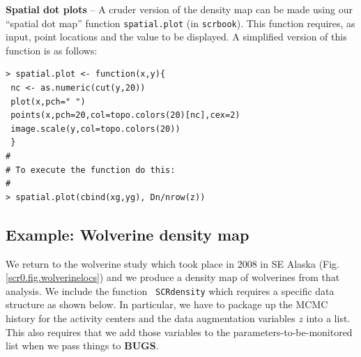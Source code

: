 {\bf Spatial dot plots } -- A cruder version of the density map can be
made using our
``spatial dot map'' function \mbox{\tt spatial.plot} (in
\mbox{\tt scrbook}).
This function requires, as input, point
locations and the value to be displayed. A simplified
version of this function is as follows:
\begin{verbatim}
> spatial.plot <- function(x,y){
 nc <- as.numeric(cut(y,20))
 plot(x,pch=" ")
 points(x,pch=20,col=topo.colors(20)[nc],cex=2)
 image.scale(y,col=topo.colors(20))
 }
#
# To execute the function do this:
#
> spatial.plot(cbind(xg,yg), Dn/nrow(z))
\end{verbatim}

\subsection{Example: Wolverine density map}

We return to the wolverine study which took place in 2008 in SE Alaska
(Fig. \ref{scr0.fig.wolverinelocs}) and we produce a density map of
wolverines from that analysis. We include the function \mbox{\tt
  SCRdensity} which requires a specific data structure as shown
below. In particular, we have to package up the MCMC history for the
activity centers and the data augmentation variables $z$ into a
list. This also requires that we add those variables to the
parameters-to-be-monitored list when we pass things to {\bf BUGS}.

